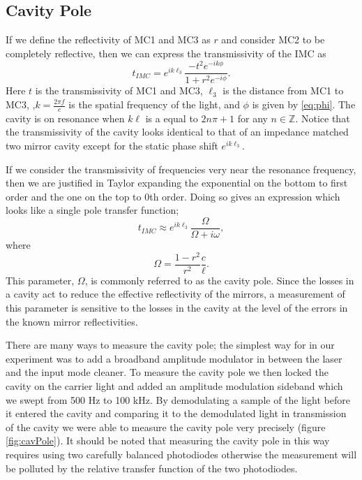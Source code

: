 \subsection{Cavity Pole}
If we define the reflectivity of MC1 and MC3 as $r$ and consider MC2 to be completely reflective, 
then we can express the transmissivity of the IMC as
\begin{equation}
	t_{IMC}=e^{ik\ell_3}\frac{-t^2e^{-ik\phi}}{1+r^2e^{-i\phi}}.
\end{equation}
Here $t$ is the transmissivity of MC1 and MC3, $\ell_3$ is the distance from MC1 to MC3, 
,$k=\tfrac{2\pi f}{c}$ is the spatial frequency of the light, and 
$\phi$ is given by \eqref{eq:phi}.
The cavity is on resonance when $k\ell$ is a equal to $2n\pi+1$ for any $n\in\mathbb{Z}$.  
Notice that the transmissivity of the cavity looks identical to that of an impedance matched 
two mirror cavity except for the static phase shift $e^{ik\ell_3}$.  

If we consider the transmissivity of frequencies very near the resonance frequency, 
then we are justified in Taylor expanding the exponential on the bottom to first order 
and the one on the top to 0th order.
Doing so gives an expression which looks like a single pole transfer function;
\begin{equation}
	t_{IMC}\approx e^{ik\ell_3}\frac{\Omega}{\Omega+i\omega},
	\label{eq:PoleApx}
\end{equation}
where
\begin{equation}
	\Omega=\frac{1-r^2}{r^2}\frac{c}{\ell}.
\end{equation}
This parameter, $\Omega$, is commonly referred to as the cavity pole.  
Since the losses in a cavity act to reduce the effective reflectivity of the mirrors, 
a measurement of this parameter is sensitive to the losses in the cavity at the level 
of the errors in the known mirror reflectivities.

There are many ways to measure the cavity pole; 
the simplest way for in our experiment was to add a broadband amplitude modulator in between the laser 
and the input mode cleaner.  
To measure the cavity pole we then locked the cavity on the carrier light and added 
an amplitude modulation sideband which we swept from 500 Hz to 100 kHz.  
By demodulating a sample of the light before it entered the cavity and comparing 
it to the demodulated light in transmission of the cavity we were able to 
measure the cavity pole very precisely (figure \ref{fig:cavPole}).  
It should be noted that measuring the cavity pole in this way requires using two 
carefully balanced photodiodes otherwise the measurement will be polluted by the 
relative transfer function of the two photodiodes.

